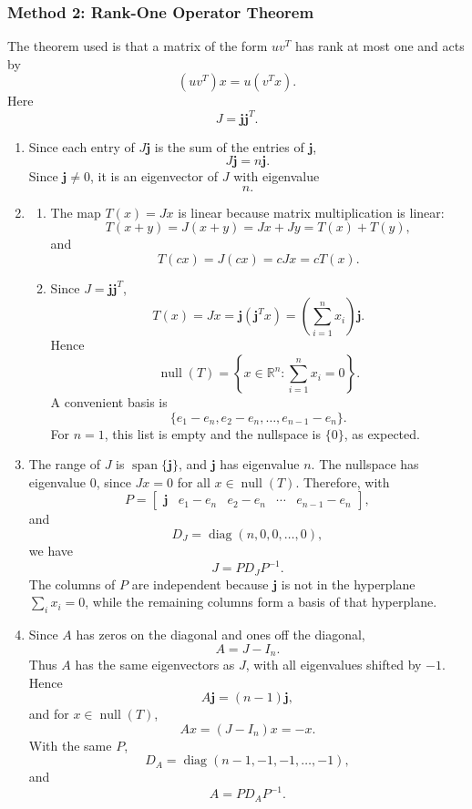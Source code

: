 \documentclass[12pt]{article}
\newcommand{\R}{\mathbb{R}}
\newcommand{\Null}{\operatorname{null}}
\newcommand{\Span}{\operatorname{span}}
\newcommand{\diag}{\operatorname{diag}}
\begin{document}
\newpage
\subsubsection{Method 2: Rank-One Operator Theorem}
The theorem used is that a matrix of the form $uv^T$ has rank at most one and acts by
\[
(uv^T)x=u(v^Tx).
\]
Here
\[
J=\mathbf j\mathbf j^T.
\]

\begin{enumerate}[label=(\alph*)]
  \item Since each entry of $J\mathbf j$ is the sum of the entries of $\mathbf j$,
  \[
  J\mathbf j=n\mathbf j.
  \]
  Since $\mathbf j\ne0$, it is an eigenvector of $J$ with eigenvalue
  \[
  \boxed{n.}
  \]

  \item
  \begin{enumerate}[label=(\roman*)]
    \item The map $T(x)=Jx$ is linear because matrix multiplication is linear:
    \[
    T(x+y)=J(x+y)=Jx+Jy=T(x)+T(y),
    \]
    and
    \[
    T(cx)=J(cx)=cJx=cT(x).
    \]

    \item Since $J=\mathbf j\mathbf j^T$,
    \[
    T(x)=Jx=\mathbf j(\mathbf j^Tx)=\left(\sum_{i=1}^{n}x_i\right)\mathbf j.
    \]
    Hence
    \[
    \Null(T)=\left\{x\in\R^n:\sum_{i=1}^{n}x_i=0\right\}.
    \]
    A convenient basis is
    \[
    \boxed{\{e_1-e_n,e_2-e_n,\ldots,e_{n-1}-e_n\}.}
    \]
    For $n=1$, this list is empty and the nullspace is $\{0\}$, as expected.
  \end{enumerate}

  \item The range of $J$ is $\Span\{\mathbf j\}$, and $\mathbf j$ has eigenvalue $n$. The nullspace has eigenvalue $0$, since $Jx=0$ for all $x\in\Null(T)$. Therefore, with
  \[
  P=\begin{bmatrix}\mathbf j& e_1-e_n& e_2-e_n&\cdots& e_{n-1}-e_n\end{bmatrix},
  \]
  and
  \[
  D_J=\diag(n,0,0,\ldots,0),
  \]
  we have
  \[
  \boxed{J=PD_JP^{-1}.}
  \]
  The columns of $P$ are independent because $\mathbf j$ is not in the hyperplane $\sum_i x_i=0$, while the remaining columns form a basis of that hyperplane.

  \item Since $A$ has zeros on the diagonal and ones off the diagonal,
  \[
  A=J-I_n.
  \]
  Thus $A$ has the same eigenvectors as $J$, with all eigenvalues shifted by $-1$. Hence
  \[
  A\mathbf j=(n-1)\mathbf j,
  \]
  and for $x\in\Null(T)$,
  \[
  Ax=(J-I_n)x=-x.
  \]
  With the same $P$,
  \[
  D_A=\diag(n-1,-1,-1,\ldots,-1),
  \]
  and
  \[
  \boxed{A=PD_AP^{-1}.}
  \]
\end{enumerate}
\end{document}
